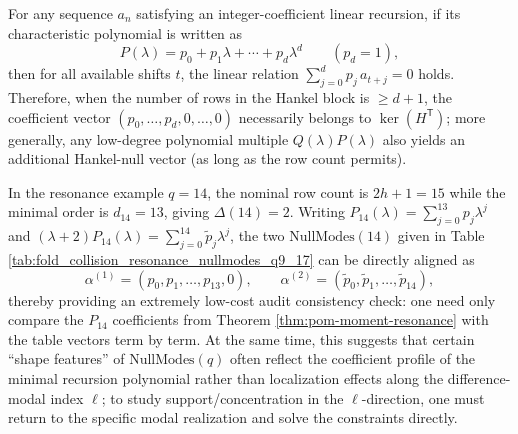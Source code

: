 \begin{remark}[Alignment of Hankel-null with the characteristic polynomial: example \texorpdfstring{$q=14$}{q=14}]\label{rem:pom-nullmodes-q14-poly-alignment}
For any sequence \(a_n\) satisfying an integer-coefficient linear recursion, if its characteristic polynomial is written as
\[
P(\lambda)=p_0+p_1\lambda+\cdots+p_d\lambda^d\qquad(p_d=1),
\]
then for all available shifts \(t\), the linear relation
\(
\sum_{j=0}^{d} p_j\,a_{t+j}=0
\)
holds.
Therefore, when the number of rows in the Hankel block is \(\ge d+1\), the coefficient vector \((p_0,\dots,p_d,0,\dots,0)\) necessarily belongs to \(\ker(H^{\mathsf T})\);
more generally, any low-degree polynomial multiple \(Q(\lambda)P(\lambda)\) also yields an additional Hankel-null vector (as long as the row count permits).
\par
In the resonance example \(q=14\), the nominal row count is \(2h+1=15\) while the minimal order is \(d_{14}=13\), giving \(\Delta(14)=2\).
Writing
\(
P_{14}(\lambda)=\sum_{j=0}^{13}p_j\lambda^j
\)
and
\(
(\lambda+2)P_{14}(\lambda)=\sum_{j=0}^{14}\widetilde p_j\lambda^j
\),
the two \(\mathrm{NullModes}(14)\) given in Table \ref{tab:fold_collision_resonance_nullmodes_q9_17} can be directly aligned as
\[
\alpha^{(1)}=(p_0,p_1,\ldots,p_{13},0),
\qquad
\alpha^{(2)}=(\widetilde p_0,\widetilde p_1,\ldots,\widetilde p_{14}),
\]
thereby providing an extremely low-cost audit consistency check: one need only compare the \(P_{14}\) coefficients from Theorem \ref{thm:pom-moment-resonance} with the table vectors term by term.
At the same time, this suggests that certain ``shape features'' of \(\mathrm{NullModes}(q)\) often reflect the coefficient profile of the minimal recursion polynomial rather than localization effects along the difference-modal index \(\ell\);
to study support/concentration in the \(\ell\)-direction, one must return to the specific modal realization and solve the constraints directly.
\end{remark}

